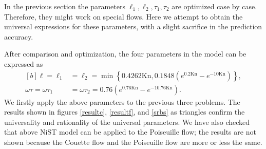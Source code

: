 \documentclass[lineno]{jfm}
\begin{document}
In the previous section the parameters $\ell_1, \ell_2, 
\tau_1, \tau_2$ are optimized  case by case. Therefore, they might work on special flows. Here we attempt to obtain the universal expressions for these parameters, with a slight sacrifice in the prediction accuracy.

After comparison and optimization, the four parameters in the model can be expressed as
\begin{equation}\label{eq41}
	\begin{aligned}[b]
		\ell=\ell_{1} &= \ell_{2} = \min\left\{0.4262\text{Kn},0.1848\left(e^{0.2\text{Kn}}-e^{-10\text{Kn}}\right)\right\}, \\
  \omega\tau=\omega\tau_{1} &= \omega\tau_{2} = 0.76\left(e^{0.76\text{Kn}}-e^{-10.76\text{Kn}}\right).
	\end{aligned}
\end{equation}
We firstly apply the above parameters to the previous three problems. The results shown in figures  \ref{resultc}, \ref{resultf}, and \ref{srbs} as triangles confirm the universality and rationality of the universal parameters.
We have also checked that above NiST model can be applied to the Poiseuille flow; the results are not shown because the Couette flow and the Poiseuille flow are more or less the same.
%
%
\end{document}
